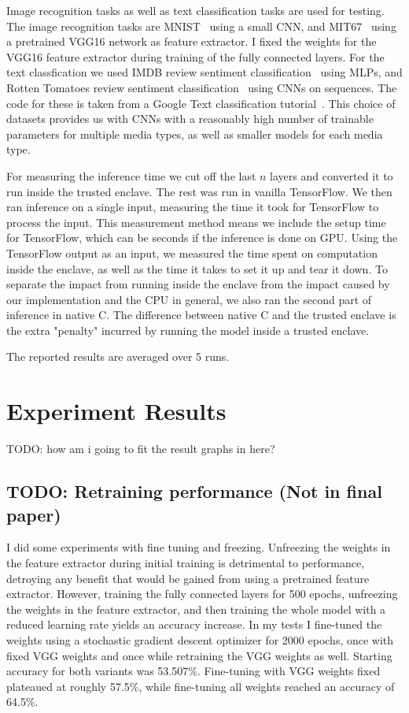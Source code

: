 \documentclass[11pt,twocolumn]{article}
\newcommand{\tf}{TensorFlow}
\begin{document}
Image recognition tasks as well as text classification tasks are used for testing.
The image recognition tasks are MNIST~\cite{noauthor_mnist_nodate} using a small CNN, and MIT67~\cite{quattoni_recognizing_nodate} using a pretrained VGG16 network as feature extractor.
I fixed the weights for the VGG16 feature extractor during training of the fully connected layers.
For the text classfication we used IMDB review sentiment classification~\cite{maas_learning_2011} using MLPs, and Rotten Tomatoes review sentiment classification~\cite{noauthor_sentiment_nodate} using CNNs on sequences.
The code for these is taken from a Google Text classification tutorial~\cite{noauthor_googleeng-edu_nodate}.
This choice of datasets provides us with CNNs with a reasonably high number of trainable parameters for multiple media types, as well as smaller models for each media type.

For measuring the inference time we cut off the last $n$ layers and converted it to run inside the trusted enclave.
The rest was run in vanilla \tf{}.
We then ran inference on a single input, measuring the time it took for \tf{} to process the input.
This measurement method means we include the setup time for \tf{}, which can be seconds if the inference is done on GPU.
Using the \tf{} output as an input, we measured the time spent on computation inside the enclave, as well as the time it takes to set it up and tear it down.
To separate the impact from running inside the enclave from the impact caused by our implementation and the CPU in general, we also ran the second part of inference in native C.
The difference between native C and the trusted enclave is the extra "penalty" incurred by running the model inside a trusted enclave.

The reported results are averaged over 5 runs.

\section{Experiment Results}
\label{sec:results}

TODO: how am i going to fit the result graphs in here?

\subsection{TODO: Retraining performance (Not in final paper)}

I did some experiments with fine tuning and freezing.
Unfreezing the weights in the feature extractor during initial training is detrimental to performance, detroying any benefit that would be gained from using a pretrained feature extractor.
However, training the fully connected layers for 500 epochs, unfreezing the weights in the feature extractor, and then training the whole model with a reduced learning rate yields an accuracy increase.
In my tests I fine-tuned the weights using a stochastic gradient descent optimizer for 2000 epochs, once with fixed VGG weights and once while retraining the VGG weights as well.
Starting accuracy for both variants was 53.507\%.
Fine-tuning with VGG weights fixed plateaued at roughly 57.5\%, while fine-tuning all weights reached an accuracy of 64.5\%.
\end{document}
